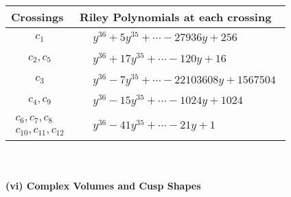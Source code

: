 \documentclass[1p]{elsarticle_modified}
\theoremstyle{definition}
\begin{document}
\begin{tabular}{m{50pt}|m{274pt}}
Crossings & \hspace{64pt}Riley Polynomials at each crossing \\
\hline $$\begin{aligned}c_{1}\end{aligned}$$&$\begin{aligned}
&y^{36}+5 y^{35}+\cdots-27936 y+256
\end{aligned}$\\
\hline $$\begin{aligned}c_{2},c_{5}\end{aligned}$$&$\begin{aligned}
&y^{36}+17 y^{35}+\cdots-120 y+16
\end{aligned}$\\
\hline $$\begin{aligned}c_{3}\end{aligned}$$&$\begin{aligned}
&y^{36}-7 y^{35}+\cdots-22103608 y+1567504
\end{aligned}$\\
\hline $$\begin{aligned}c_{4},c_{9}\end{aligned}$$&$\begin{aligned}
&y^{36}-15 y^{35}+\cdots-1024 y+1024
\end{aligned}$\\
\hline $$\begin{aligned}c_{6},c_{7},c_{8}\\c_{10},c_{11},c_{12}\end{aligned}$$&$\begin{aligned}
&y^{36}-41 y^{35}+\cdots-21 y+1
\end{aligned}$\\
\hline
\end{tabular}\\~\\
\newpage\flushleft \textbf{(vi) Complex Volumes and Cusp Shapes}
\end{document}
